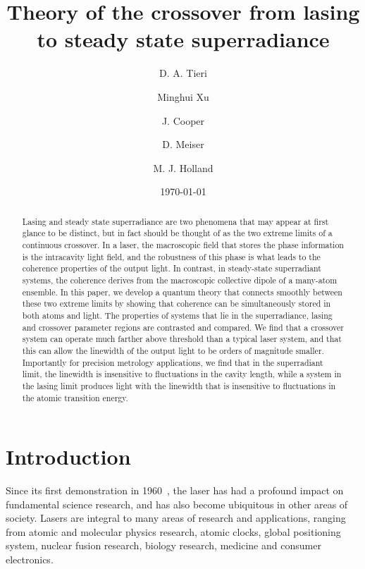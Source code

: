 \documentclass[aps,prl,twocolumn,
superscriptaddress,groupedaddress]{revtex4}
\begin{document}
\title{Theory of the crossover from lasing to steady state superradiance}
\author{D. A. Tieri}
\author{Minghui Xu}
\author{J. Cooper}
\author{D. Meiser}
\author{M. J. Holland}
\date{\today}

\begin{abstract}
  Lasing and steady state superradiance are two phenomena that may
  appear at first glance to be distinct, but in fact should be thought
  of as the two extreme limits of a continuous crossover. In a laser,
  the macroscopic field that stores the phase information is the
  intracavity light field, and the robustness of this phase is what
  leads to the coherence properties of the output light. In contrast,
  in steady-state superradiant systems, the coherence derives from the
  macroscopic collective dipole of a many-atom ensemble. In this
  paper, we develop a quantum theory that connects smoothly between
  these two extreme limits by showing that coherence can be
  simultaneously stored in both atoms and light. The properties of
  systems that lie in the superradiance, lasing and crossover
  parameter regions are contrasted and compared. We find that a
  crossover system can operate much farther above threshold than a
  typical laser system, and that this can allow the linewidth of the
  output light to be orders of magnitude smaller. Importantly for
  precision metrology applications, we find that in the superradiant
  limit, the linewidth is insensitive to fluctuations in the cavity
  length, while a system in the lasing limit produces light with the
  linewidth that is insensitive to fluctuations in the atomic
  transition energy.
\end{abstract}
\maketitle

\section{Introduction}
Since its first demonstration in 1960~\cite{maiman1960stimulated}, the
laser has had a profound impact on fundamental science research, and
has also become ubiquitous in other areas of society. Lasers are
integral to many areas of research and applications, ranging from
atomic and molecular physics research, atomic clocks, global
positioning system, nuclear fusion research, biology research,
medicine and consumer electronics.
\end{document}
